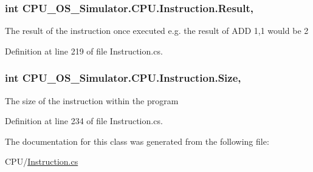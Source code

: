 \hypertarget{class_c_p_u___o_s___simulator_1_1_c_p_u_1_1_instruction_a8e0f7c63850af7cfd8a41c066c01838e}{}
\subsubsection[{Result}]{\setlength{\rightskip}{0pt plus 5cm}int C\+P\+U\+\_\+\+O\+S\+\_\+\+Simulator.\+C\+P\+U.\+Instruction.\+Result\hspace{0.3cm}{\ttfamily [get]}, {\ttfamily [set]}}\label{class_c_p_u___o_s___simulator_1_1_c_p_u_1_1_instruction_a8e0f7c63850af7cfd8a41c066c01838e}


The result of the instruction once executed e.\+g. the result of A\+D\+D 1,1 would be 2 



Definition at line 219 of file Instruction.\+cs.

\hypertarget{class_c_p_u___o_s___simulator_1_1_c_p_u_1_1_instruction_a7c60418808e7bd6cb1964a227dcd9dac}{}
\subsubsection[{Size}]{\setlength{\rightskip}{0pt plus 5cm}int C\+P\+U\+\_\+\+O\+S\+\_\+\+Simulator.\+C\+P\+U.\+Instruction.\+Size\hspace{0.3cm}{\ttfamily [get]}, {\ttfamily [set]}}\label{class_c_p_u___o_s___simulator_1_1_c_p_u_1_1_instruction_a7c60418808e7bd6cb1964a227dcd9dac}


The size of the instruction within the program 



Definition at line 234 of file Instruction.\+cs.



The documentation for this class was generated from the following file\+:\begin{DoxyCompactItemize}
\item 
C\+P\+U/\hyperlink{_instruction_8cs}{Instruction.\+cs}\end{DoxyCompactItemize}
